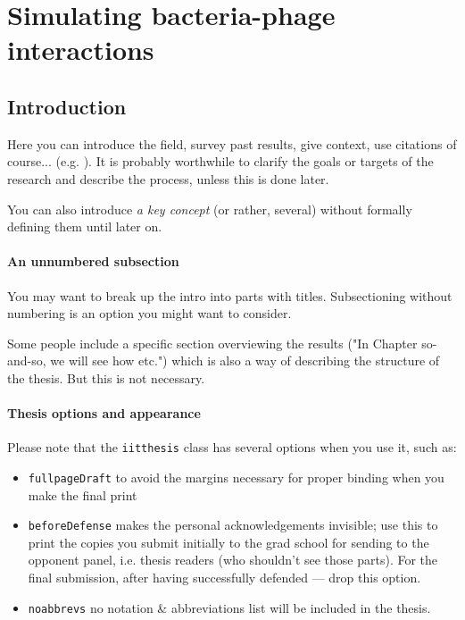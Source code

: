 \part{Simulating bacteria-phage interactions}
\chapter{Introduction}
\label{chap:intro}


Here you can introduce the field, survey past results, give context, use citations of course... (e.g. \cite{CLR}). It is probably worthwhile to clarify the goals or targets of the research and describe the process, unless this is done later.

You can also introduce \emph{a key concept} (or rather, several) without formally defining them until later on.

\subsection*{An unnumbered subsection}

You may want to break up the intro into parts with titles. Subsectioning without numbering is an option you might want to consider.

Some people include a specific section overviewing the results ("In Chapter so-and-so, we will see how etc.") which is also a way of describing the structure of the thesis. But this is not necessary.

\subsection*{Thesis options and appearance}

Please note that the \texttt{iitthesis} class has several options when you use it, such as:
\begin{itemize}
\item \texttt{fullpageDraft} to avoid the margins necessary for proper binding when you make the final print
\item \texttt{beforeDefense} makes the personal acknowledgements invisible; use this to print the copies you submit initially to the grad school for sending to the opponent panel, i.e. thesis readers (who shouldn't see those parts). For the final submission, after having successfully defended --- drop this option. 
\item \texttt{noabbrevs} no notation \& abbreviations list will be included in the thesis.
\end{itemize}

